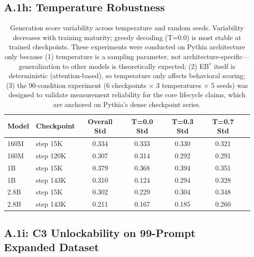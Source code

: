 \documentclass[10pt]{article} %
\begin{document}
\subsection*{A.1h: Temperature Robustness}\mbox{}

\begin{table}[H]
\centering
\small
\begin{tabular}{|l|l|c|c|c|c|c|}
\hline
\textbf{Model} & \textbf{Checkpoint} & \textbf{Overall Std} & \textbf{T=0.0 Std} & \textbf{T=0.3 Std} & \textbf{T=0.7 Std} \\
\hline
160M & step 15K & 0.334 & 0.333 & 0.330 & 0.321 \\
160M & step 120K & 0.307 & 0.314 & 0.292 & 0.291 \\
1B & step 15K & 0.379 & 0.368 & 0.394 & 0.351 \\
1B & step 143K & 0.310 & 0.124 & 0.294 & 0.328 \\
2.8B & step 15K & 0.302 & 0.229 & 0.304 & 0.348 \\
2.8B & step 143K & 0.211 & 0.167 & 0.185 & 0.260 \\
\hline
\end{tabular}
\caption{Generation score variability across temperature and random seeds. Variability decreases with training maturity; greedy decoding (T=0.0) is most stable at trained checkpoints. These experiments were conducted on Pythia architecture only because (1) temperature is a sampling parameter, not architecture-specific—generalization to other models is theoretically expected; (2) EB$^*$ itself is deterministic (attention-based), so temperature only affects behavioral scoring; (3) the 90-condition experiment (6 checkpoints $\times$ 3 temperatures $\times$ 5 seeds) was designed to validate measurement reliability for the core lifecycle claims, which are anchored on Pythia's dense checkpoint series.}
\label{tab:temperature_robustness}
\end{table}

\subsection*{A.1i: C3 Unlockability on 99-Prompt Expanded Dataset}\mbox{}
\end{document}
